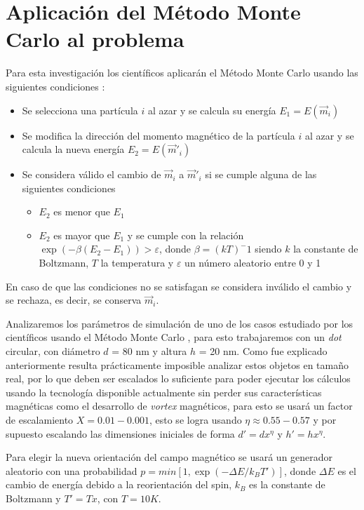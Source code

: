 \section{Aplicación del Método Monte Carlo al problema}

Para esta investigación los científicos aplicarán el Método Monte Carlo usando las siguientes condiciones \citep{TesisAllende}:

\begin{itemize}
 \item Se selecciona una partícula $i$ al azar y se calcula su energía $E_1 = E(\vec{m}_i)$
 \item Se modifica la dirección del momento magnético de la partícula $i$ al azar y se calcula la nueva energía $E_2 = E(\vec{m}'_i)$
 \item Se considera válido el cambio de $\vec{m}_i$ a $\vec{m}'_i$ si se cumple alguna de las siguientes condiciones
 \begin{itemize}
  \item $E_2$ es menor que $E_1$
  \item $E_2$ es mayor que $E_1$ y se cumple con la relación $\exp(-\beta(E_2 - E_1)) > \varepsilon$, donde $\beta = (kT)^-1$ siendo $k$ la constante de Boltzmann, $T$ la temperatura \citep{newmanb99} y $\varepsilon$ un número aleatorio entre 0 y 1
 \end{itemize}
\end{itemize}

En caso de que las condiciones no se satisfagan se considera inválido el cambio y se rechaza, es decir, se conserva $\vec{m}_i$.

Analizaremos los parámetros de simulación de uno de los casos estudiado por los científicos usando el Método Monte Carlo \citep{asymmetricMagneticDots}, para esto trabajaremos con un \emph{dot} circular, con diámetro $d$ = 80 nm y altura $h$ = 20 nm. Como fue explicado anteriormente resulta prácticamente imposible analizar estos objetos en tamaño real, por lo que deben ser escalados lo suficiente para poder ejecutar los cálculos usando la tecnología disponible actualmente sin perder sus características magnéticas como el desarrollo de \emph{vortex} magnéticos, para esto se usará un factor de escalamiento $X = 0.01 - 0.001$, esto se logra usando $\eta \approx 0.55 - 0.57$ y por supuesto escalando las dimensiones iniciales de forma $d' = dx^\eta$ y $h' = hx^\eta$.

Para elegir la nueva orientación del campo magnético se usará un generador aleatorio con una probabilidad $p = min[1, \exp(-\Delta E/k_BT')]$, donde $\Delta E$ es el cambio de energía debido a la reorientación del spin, $k_B$ es la constante de Boltzmann y $T' = Tx$, con $T = 10K$.

